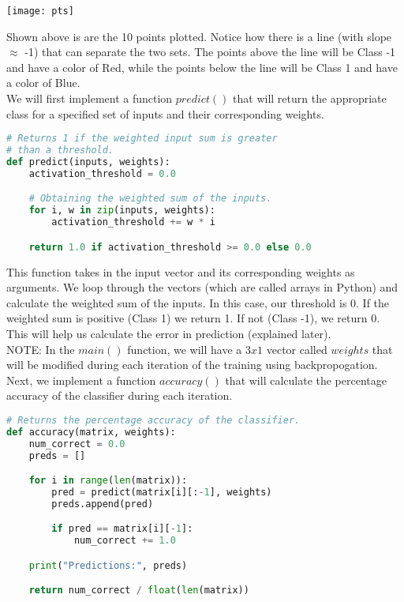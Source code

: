 	\begin{center}
		\texttt{[image: pts]}
	\end{center}
	
Shown above is are the 10 points plotted. Notice how there is a line (with slope $\approx$ -1) that can separate the two sets. The points above the line will be Class -1 and have a color of Red, while the points below the line will be Class 1 and have a color of Blue. \\

We will first implement a function $predict()$ that will return the appropriate class for a specified set of inputs and their corresponding weights. \\


	\begin{lstlisting}[language=Python, frame=single]
# Returns 1 if the weighted input sum is greater 
# than a threshold.
def predict(inputs, weights):
    activation_threshold = 0.0

    # Obtaining the weighted sum of the inputs.
    for i, w in zip(inputs, weights):
        activation_threshold += w * i

    return 1.0 if activation_threshold >= 0.0 else 0.0
	\end{lstlisting}
	
This function takes in the input vector and its corresponding weights as arguments. We loop through the vectors (which are called arrays in Python) and calculate the weighted sum of the inputs. In this case, our threshold is 0. If the weighted sum is positive (Class 1) we return 1. If not (Class -1), we return 0. This will help us calculate the error in prediction (explained later). \\

NOTE: In the $main()$ function, we will have a $3x1$ vector called $weights$ that will be modified during each iteration of the training using backpropogation. \\

Next, we implement a function $accuracy()$ that will calculate the percentage accuracy of the classifier during each iteration. \\ 

	\begin{lstlisting}[language=Python, frame=single]
# Returns the percentage accuracy of the classifier.
def accuracy(matrix, weights):
    num_correct = 0.0
    preds = []

    for i in range(len(matrix)):
        pred = predict(matrix[i][:-1], weights)
        preds.append(pred)

        if pred == matrix[i][-1]:
            num_correct += 1.0

    print("Predictions:", preds)

    return num_correct / float(len(matrix))
	\end{lstlisting}
	
